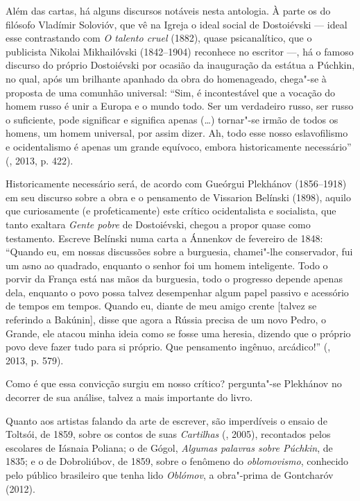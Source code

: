 Além das cartas, há alguns discursos notáveis nesta antologia. À parte
os do filósofo Vladímir Solovióv, que vê na Igreja o ideal social de
Dostoiévski --- ideal esse contrastando com \emph{O talento
cruel} (1882), quase psicanalítico, que o publicista Nikolai Mikhailóvski (1842--1904) reconhece
no escritor ---, há o famoso discurso do próprio Dostoiévski por ocasião da
inauguração da estátua a Púchkin, no qual, após um brilhante
apanhado da obra do homenageado, chega"-se à proposta de uma comunhão
universal: ``Sim, é incontestável que a vocação do homem russo é unir a
Europa e o mundo todo. Ser um verdadeiro russo, ser russo o suficiente,
pode significar e significa apenas (\ldots{}) tornar"-se irmão de todos os
homens, um homem universal, por assim dizer. Ah, todo esse nosso
eslavofilismo e ocidentalismo é apenas um grande equívoco, embora
historicamente necessário'' (, 2013, p. 422).

Historicamente necessário será, de acordo com Gueórgui Plekhánov (1856--1918) em seu
discurso sobre a obra e o pensamento de Vissarion Belínski (1898), 
aquilo que curiosamente (e profeticamente) este crítico ocidentalista e socialista, que tanto
exaltara \emph{Gente pobre} de Dostoiévski, chegou a propor quase como
testamento. Escreve Belínski numa carta a
Ánnenkov de fevereiro de 1848: ``Quando eu, em nossas discussões sobre a burguesia,
chamei"-lhe conservador, fui um asno ao quadrado, enquanto o senhor foi
um homem inteligente. Todo o porvir da França está nas mãos da
burguesia, todo o progresso depende apenas dela, enquanto o povo possa
talvez desempenhar algum papel passivo e acessório de tempos em tempos.
Quando eu, diante de meu amigo crente [talvez se referindo a Bakúnin], disse que agora a Rússia precisa de um novo Pedro, o Grande, ele atacou minha ideia como se fosse uma
heresia, dizendo que o próprio povo deve fazer tudo para si próprio. Que
pensamento ingênuo, arcádico!'' (, 2013, p. 579).

Como é que essa convicção surgiu em
nosso crítico? pergunta"-se Plekhánov no decorrer de sua
análise, talvez a mais importante do livro.

Quanto aos artistas falando da arte de escrever, são imperdíveis o
ensaio de Toltsói, de 1859, sobre os contos de suas \emph{Cartilhas} (, 2005), recontados pelos escolares de Iásnaia Poliana; o de Gógol, \emph{Algumas palavras sobre Púchkin}, de 1835; e o de Dobroliúbov, de 1859, sobre o fenômeno do \emph{oblomovismo}, conhecido pelo público
brasileiro que tenha lido \emph{Oblómov}, a obra"-prima de Gontcharóv
(2012).

